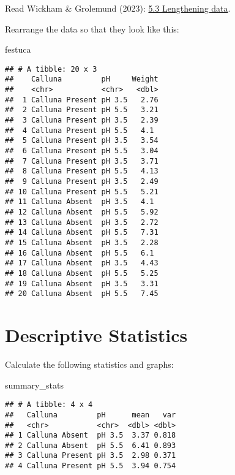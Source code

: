 \documentclass[
]{article}
\newenvironment{Shaded}{\begin{snugshade}}{\end{snugshade}}
\newcommand{\NormalTok}[1]{#1}
\begin{document}
Read Wickham \& Grolemund (2023):
\href{https://r4ds.hadley.nz/data-tidy\#sec-pivoting}{5.3 Lengthening
data}.

Rearrange the data so that they look like this:

\begin{Shaded}
\begin{Highlighting}[]
\NormalTok{festuca}
\end{Highlighting}
\end{Shaded}

\begin{verbatim}
## # A tibble: 20 x 3
##    Calluna         pH     Weight
##    <chr>           <chr>   <dbl>
##  1 Calluna Present pH 3.5   2.76
##  2 Calluna Present pH 5.5   3.21
##  3 Calluna Present pH 3.5   2.39
##  4 Calluna Present pH 5.5   4.1 
##  5 Calluna Present pH 3.5   3.54
##  6 Calluna Present pH 5.5   3.04
##  7 Calluna Present pH 3.5   3.71
##  8 Calluna Present pH 5.5   4.13
##  9 Calluna Present pH 3.5   2.49
## 10 Calluna Present pH 5.5   5.21
## 11 Calluna Absent  pH 3.5   4.1 
## 12 Calluna Absent  pH 5.5   5.92
## 13 Calluna Absent  pH 3.5   2.72
## 14 Calluna Absent  pH 5.5   7.31
## 15 Calluna Absent  pH 3.5   2.28
## 16 Calluna Absent  pH 5.5   6.1 
## 17 Calluna Absent  pH 3.5   4.43
## 18 Calluna Absent  pH 5.5   5.25
## 19 Calluna Absent  pH 3.5   3.31
## 20 Calluna Absent  pH 5.5   7.45
\end{verbatim}

\hypertarget{descriptive-statistics}{%
\section{Descriptive Statistics}\label{descriptive-statistics}}

Calculate the following statistics and graphs:

\begin{Shaded}
\begin{Highlighting}[]
\NormalTok{summary\_stats}
\end{Highlighting}
\end{Shaded}

\begin{verbatim}
## # A tibble: 4 x 4
##   Calluna         pH      mean   var
##   <chr>           <chr>  <dbl> <dbl>
## 1 Calluna Absent  pH 3.5  3.37 0.818
## 2 Calluna Absent  pH 5.5  6.41 0.893
## 3 Calluna Present pH 3.5  2.98 0.371
## 4 Calluna Present pH 5.5  3.94 0.754
\end{verbatim}
\end{document}
